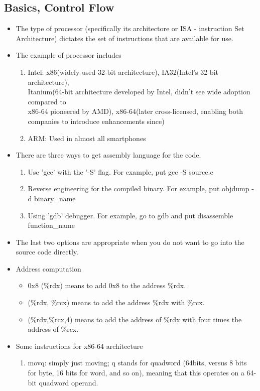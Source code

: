 \documentclass[11pt,reqno]{amsart}
\theoremstyle{remark}
\begin{document}
\subsection*{Basics, Control Flow}
\begin{itemize}
\item The type of processor (specifically its architectore or ISA - instruction Set Architecture) dictates the set
 of instructions that are available for use.
\item The example of processor includes
\begin{enumerate}
\item Intel: x86(widely-used 32-bit architecture), IA32(Intel's 32-bit architecture), \\
Itanium(64-bit architecture developed by Intel, didn't see wide adoption compared to\\
 x86-64 pioneered by AMD), x86-64(later cross-licensed, enabling both companies to introduce enhancements since)
\item ARM: Used in almost all smartphones
\end{enumerate}
\item There are three ways to get assembly language for the code.
\begin{enumerate}
\item Use 'gcc' with the '-S' flag. For example, put gcc -S source.c
\item Reverse engineering for the compiled binary. For example, put objdump -d binary\_name
\item Using 'gdb' debugger. For example, go to gdb and put disassemble function\_name
\end{enumerate}
\item The last two options are appropriate when you do not want to go into the source code directly.
\item Address computation
\begin{itemize}
\item 0x8 (\%rdx) means to add 0x8 to the address \%rdx.
\item (\%rdx, \%rcx) means to add the address \%rdx with \%rcx.
\item (\%rdx,\%rcx,4) means to add the address of \%rdx with four times the address of \%rcx.
\end{itemize}
\item Some instructions for x86-64 architecture
\begin{enumerate}
\item movq: simply just moving; q stands for quadword (64bits, versus 8 bits for byte, 16 bits for word, and so on), meaning that this operates on a 64-bit quadword operand.

\end{enumerate}
\end{itemize}
\end{document}
